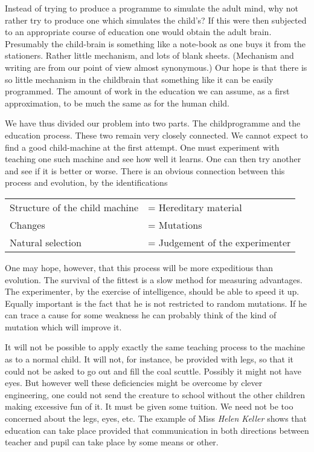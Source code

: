     Instead of trying to produce a programme to simulate the adult mind, why not rather try to produce one which simulates the child's? If this were then subjected to an appropriate course of education one would obtain the adult brain. Presumably the child-brain is something like a note-book as one buys it from the stationers. Rather little mechanism, and lots of blank sheets. (Mechanism and writing are from our point of view almost synonymous.) Our hope is that there is so little mechanism in the childbrain that something like it can be easily programmed. The amount of work in the education we can assume, as a first approximation, to be much the same as for the human child.

    We have thus divided our problem into two parts. The childprogramme and the education process. These two remain very closely connected. We cannot expect to find a good child-machine at the first attempt. One must experiment with teaching one such machine and see how well it learns. One can then try another and see if it is better or worse. There is an obvious connection between this process and evolution, by the identifications

    \begin{table}[]
        \begin{tabular}{ll}
        Structure of the child machine & = Hereditary material           \\
        Changes                        & = Mutations                     \\
        Natural selection              & = Judgement of the experimenter
        \end{tabular}
    \end{table}
    
    \noindent
    One may hope, however, that this process will be more expeditious than evolution. The survival of the fittest is a slow method for measuring advantages. The experimenter, by the exercise of intelligence, should be able to speed it up. Equally important is the fact that he is not restricted to random mutations. If he can trace a cause for some weakness he can probably think of the kind of mutation which will improve it.

    It will not be possible to apply exactly the same teaching process to the machine as to a normal child. It will not, for instance, be provided with legs, so that it could not be asked to go out and fill the coal scuttle. Possibly it might not have eyes. But however well these deficiencies might be overcome by clever engineering, one could not send the creature to school without the other children making excessive fun of it. It must be given some tuition. We need not be too concerned about the legs, eyes, etc. The example of Miss \textit{Helen Keller} shows that education can take place provided that communication in both directions between teacher and pupil can take place by some means or other.

